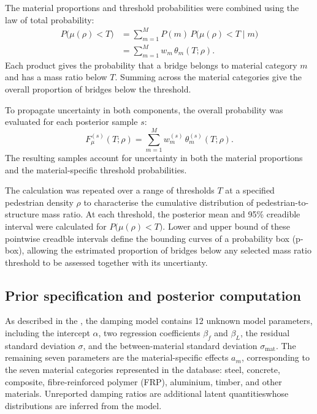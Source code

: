 \documentclass[preprint,a4paper,12pt]{elsarticle}
\begin{document}
The material proportions and threshold probabilities were combined using the law of total probability:
\begin{equation}
    \begin{aligned}
    P\bigl(\mu(\rho)<T\bigr)
    &=
    \sum_{m=1}^{M}
    P(m)\,P\bigl(\mu(\rho)<T\mid m\bigr) \\
    &=
    \sum_{m=1}^{M}
    w_m\,\theta_m(T;\rho).
    \end{aligned}
    \label{eq:mass_ratio_probability}
\end{equation}
Each product gives the probability that a bridge belongs to material category $m$ and has a mass ratio below $T$.
Summing across the material categories give the overall proportion of bridges below the threshold.

To propagate uncertainty in both components, the overall probability was evaluated for each posterior sample $s$:
\begin{equation}
    F_{\mu}^{(s)}(T;\rho)
    =
    \sum_{m=1}^{M}
    w_m^{(s)}\,\theta_m^{(s)}(T;\rho).
\end{equation}
The resulting samples account for uncertainty in both the material proportions and the material-specific threshold probabilities.

The calculation was repeated over a range of thresholds $T$ at a specified pedestrian density $\rho$ to characterise the cumulative distribution of pedestrian-to-structure mass ratio. 
At each threshold, the posterior mean and 95\% creadible interval were calculated for $P\bigl(\mu(\rho)<T\bigr)$.
Lower and upper bound of these pointwise creadble intervals define the bounding curves of a probability box (p-box), allowing the estrimated proportion of bridges below any selected mass ratio threshold to be assessed together with its uncertianty.


\subsection{Prior specification and posterior computation}
As described in the , the damping model contains 12 unknown model parameters, including the intercept $\alpha$, two regression coefficients $\beta_f$ and $\beta_L$, the residual standard deviation $\sigma$, and the between-material standard deviation $\sigma_{\mathrm{mat}}$.
The remaining seven parameters are the material-specific effects $a_m$, corresponding to the seven material categories represented in the database: steel, concrete, composite, fibre-reinforced polymer (FRP), aluminium, timber, and other materials.
Unreported damping ratios are additional latent quantitieswhose distributions are inferred from the model.
\end{document}
